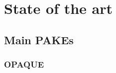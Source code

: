 \documentclass[../report.tex]{subfiles}
\begin{document}





\chapter{State of the art}
\section{Main PAKEs}

\subsection{OPAQUE}









\end{document}
